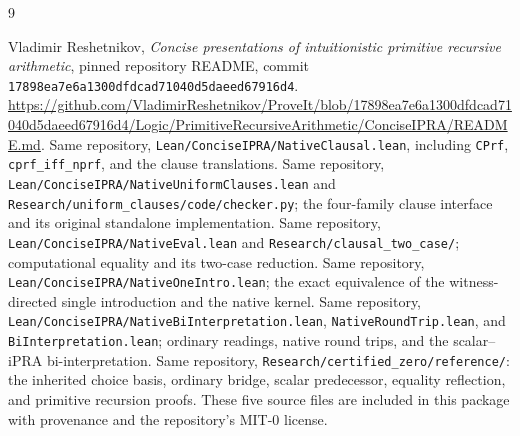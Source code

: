 \documentclass[11pt]{article}
\theoremstyle{definition}\newtheorem{definition}[theorem]{Definition}
\theoremstyle{remark}\newtheorem{remark}[theorem]{Remark}
\newcommand{\code}[1]{\texttt{#1}}
\begin{document}
\clearpage
\begin{thebibliography}{9}
\raggedright
{} Vladimir Reshetnikov, \emph{Concise presentations of
intuitionistic primitive recursive arithmetic}, pinned repository README,
commit \code{17898ea7e6a1300dfdcad71040d5daeed67916d4}.
\url{https://github.com/VladimirReshetnikov/ProveIt/blob/17898ea7e6a1300dfdcad71040d5daeed67916d4/Logic/PrimitiveRecursiveArithmetic/ConciseIPRA/README.md}.
 Same repository, \code{Lean/ConciseIPRA/NativeClausal.lean},
including \code{CPrf}, \code{cprf\_iff\_nprf}, and the clause translations.
 Same repository,
\code{Lean/ConciseIPRA/NativeUniformClauses.lean} and
\code{Research/uniform\_clauses/code/checker.py}; the four-family clause
interface and its original standalone implementation.
 Same repository,
\code{Lean/ConciseIPRA/NativeEval.lean} and
\code{Research/clausal\_two\_case/}; computational equality and its
two-case reduction.
 Same repository,
\code{Lean/ConciseIPRA/NativeOneIntro.lean}; the exact equivalence of
the witness-directed single introduction and the native kernel.
 Same repository,
\code{Lean/ConciseIPRA/NativeBiInterpretation.lean},
\code{NativeRoundTrip.lean}, and \code{BiInterpretation.lean}; ordinary
readings, native round trips, and the scalar--iPRA bi-interpretation.
 Same repository,
\code{Research/certified\_zero/reference/}: the inherited choice basis,
ordinary bridge, scalar predecessor, equality reflection, and primitive
recursion proofs. These five source files are included in this package
with provenance and the repository's MIT-0 license.
\end{thebibliography}
\end{document}
